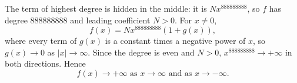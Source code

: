 The term of highest degree is hidden in the middle: it is $Nx^{888888888}$, so $f$ has degree $888888888$ and leading coefficient $N>0$. For $x\ne0$,
\[f(x)=Nx^{888888888}\left(1+g(x)\right),\]
where every term of $g(x)$ is a constant times a negative power of $x$, so $g(x)\to0$ as $|x|\to\infty$. Since the degree is even and $N>0$, $x^{888888888}\to+\infty$ in both directions. Hence
\[\boxed{f(x)\to+\infty\text{ as }x\to\infty\text{ and as }x\to-\infty}.\]
